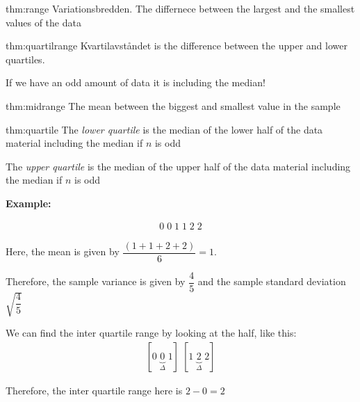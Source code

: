 \par\bigskip
\begin{theo}[Range]{thm:range}
  Variationsbredden. The differnece between the largest and the smallest values of the data 
\end{theo}
\par\bigskip
\begin{theo}{thm:quartilrange}
  Kvartilavståndet is the difference between the upper and lower quartiles.\par
  \noindent If we have an odd amount of data it is including the median!
\end{theo}
\par\bigskip
\begin{theo}{thm:midrange}
  The mean between the biggest and smallest value in the sample
\end{theo}
\par\bigskip
\begin{theo}{thm:quartile}
  The \textit{lower quartile} is the median of the lower half of the data material including the median if $n$ is odd
  \par\bigskip
  \noindent The \textit{upper quartile} is the median of the upper half of the data material including the median if $n$ is odd
\end{theo}
\par\bigskip
\noindent\textbf{Example:}\par
\begin{equation*}
  \begin{gathered}
    0\;0\;1\;1\;2\;2
  \end{gathered}
\end{equation*}\par
\noindent Here, the mean is given by $\dfrac{(1+1+2+2)}{6} = 1$.\par
\noindent Therefore, the sample variance is given by $\dfrac{4}{5}$ and the sample standard deviation $\sqrt{\dfrac{4}{5}}$\par
\noindent We can find the inter quartile range by looking at the half, like this:
\begin{equation*}
  \begin{gathered}
    [0\;\underbrace{0}_{\text{$\Delta$}}\;1]\;[1\;\underbrace{2}_{\text{$\Delta$}}\;2]
  \end{gathered}
\end{equation*}\par
\noindent Therefore, the inter quartile range here is $2-0=2$
\par\bigskip

